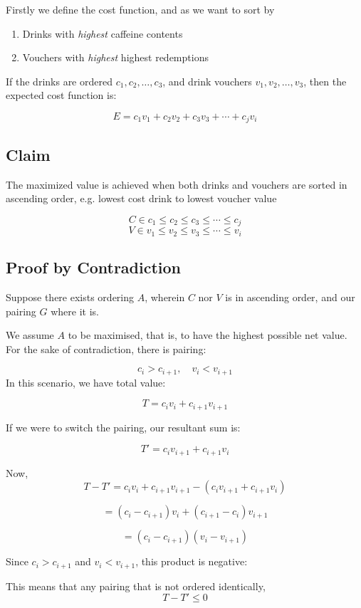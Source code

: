 \documentclass[12pt]{article}
\begin{document}
Firstly we define the cost function, and as we want to sort by 
\begin{enumerate}
    \item Drinks with \textit{highest} caffeine contents 
    \item Vouchers with \textit{highest} highest redemptions 
\end{enumerate}

If the drinks are ordered $c_1, c_2, \ldots, c_3$, and drink vouchers $v_1, v_2, \ldots, v_3$, then the expected cost function is: 

\[
E = c_1 v_1 + c_2 v_2 + c_3 v_3 + \cdots + c_j v_i
\]

\subsection*{Claim}
The maximized value is achieved when both drinks and vouchers are sorted in ascending order, e.g. lowest cost drink to lowest voucher value

\[
C \in c_1 \le c_2 \le c_3 \le \cdots \le c_j
\]
\[
V \in v_1 \le v_2 \le v_3 \le \cdots \le v_i
\]

\subsection*{Proof by Contradiction}

Suppose there exists ordering $A$, wherein $C$ nor $V$ is in ascending order, and our pairing $G$ where it is. 

We assume $A$ to be maximised, that is, to have the highest possible net value. For the sake of contradiction, there is pairing: 

\[
c_i > c_{i+1}, \quad v_i < v_{i+1}
\]
In this scenario, we have total value:

\[
T = c_i v_i + c_{i+1} v_{i+1}
\]

If we were to switch the pairing, our resultant sum is:

\[
T' = c_i v_{i+1} + c_{i+1} v_i
\]

Now,
\[
T - T' = c_i v_i + c_{i+1} v_{i+1} - (c_i v_{i+1} + c_{i+1} v_i)
\]

\[
= (c_i - c_{i+1}) v_i + (c_{i+1} - c_i) v_{i+1}
\]

\[
= (c_i - c_{i+1})(v_i - v_{i+1})
\]

Since $c_i > c_{i+1}$ and $v_i < v_{i+1}$, this product is negative:

This means that any pairing that is not ordered identically, 
\[
T - T' \le 0 
\]
\end{document}
